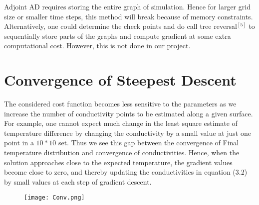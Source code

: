 \documentclass[10pt,a4paper]{report}
\begin{document}
Adjoint AD requires storing the entire graph of simulation. Hence for larger grid size or smaller time steps, this method will break because of memory constraints. Alternatively, one could determine the check points and do call tree reversal$^{[5]}$ to sequentially store parts of the graphs and compute gradient at some extra computational cost. However, this is not done in our project.

\section{Convergence of Steepest Descent}

The considered cost function becomes less sensitive to the parameters as we increase the number of conductivity points to be estimated along a given surface. For example, one cannot expect much change in the least square estimate of temperature difference by changing the conductivity by a small value at just one point in a $10*10$ set. Thus we see this gap between the convergence of Final temperature distribution and convergence of conductivities. Hence, when the solution approaches close to the expected temperature, the gradient values become close to zero, and thereby updating the conductivities in equation (3.2)  by small values at each step of gradient descent.
\begin{figure}[H]
\begin{center}
\texttt{[image: Conv.png]} 
\caption{} %
\label{fig:Conv}
\end{center}
\end{figure}


%
%
%
\end{document}
